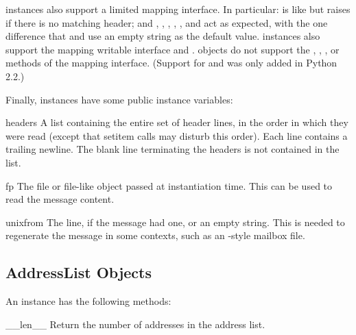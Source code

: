  instances also support a limited mapping interface.
In particular:  is like
 but raises  if
there is no matching header; and ,
,
, ,
 , and
 act as expected,
with the one difference that  and 
use an empty string as the default value.   instances
also support the mapping writable interface  and .   objects do not
support the , , , or
 methods of the mapping interface.  (Support for
 and  was only added in Python
2.2.)

Finally,  instances have some public instance variables:

\begin{memberdesc}{headers}
A list containing the entire set of header lines, in the order in
which they were read (except that setitem calls may disturb this
order). Each line contains a trailing newline.  The
blank line terminating the headers is not contained in the list.
\end{memberdesc}

\begin{memberdesc}{fp}
The file or file-like object passed at instantiation time.  This can
be used to read the message content.
\end{memberdesc}

\begin{memberdesc}{unixfrom}
The \UNIX{}  line, if the message had one, or an empty
string.  This is needed to regenerate the message in some contexts,
such as an -style mailbox file.
\end{memberdesc}


\subsection{AddressList Objects \label{addresslist-objects}}

An  instance has the following methods:

\begin{methoddesc}{__len__}{}
Return the number of addresses in the address list.
\end{methoddesc}

